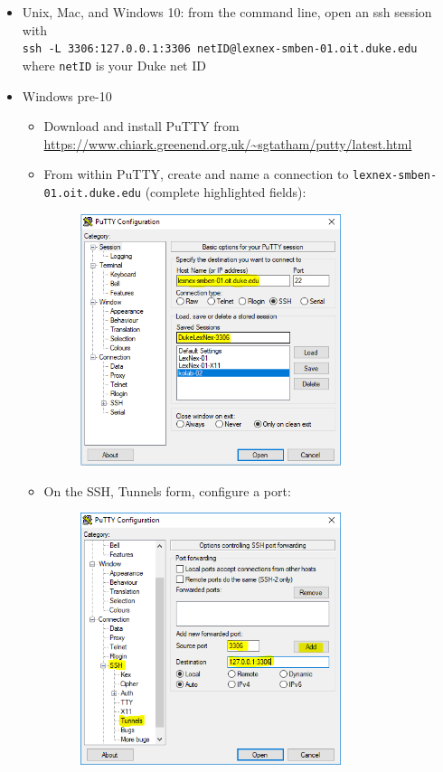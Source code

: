 \documentclass[10pt, letterpaper]{article}
\begin{document}
\begin{spacing}{1.0}
\begin{itemize}
    \item Unix, Mac, and Windows 10:  from the command line, open an ssh session with\\[2pt] \texttt{ssh -L 3306:127.0.0.1:3306 {\color{midgreen}netID}@lexnex-smben-01.oit.duke.edu}\\[2pt] where \texttt{{\color{midgreen}netID}} is your Duke net ID
    \item Windows pre-10\vspace{-0.02in}
      \begin{itemize}
          \item Download and install PuTTY from \url{https://www.chiark.greenend.org.uk/~sgtatham/putty/latest.html}
          \item From within PuTTY, create and name a connection to \texttt{lexnex-smben-01.oit.duke.edu} (complete highlighted fields):\\[-4pt]
          \begin{figure}[H]
              \includegraphics[width=3in]{Putty01.png}
              \centering
              \caption*{\vspace{-0.5in}}
              \label{}
          \end{figure}
          \vspace{-0.2in}
          \item On the SSH, Tunnels form, configure a port:\\[-4pt]
          \begin{figure}[H]
              \includegraphics[width=3in]{Putty02.png}

\end{figure}
\end{itemize}
\end{itemize}
\end{spacing}
\end{document}
